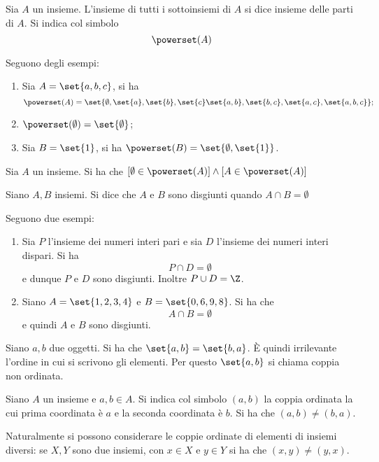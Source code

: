 \begin{definition}\label{def:insieme_parti}
    Sia \(A\) un insieme. L'insieme di tutti i sottoinsiemi di \(A\) si dice insieme delle parti di \(A\). Si indica col simbolo
    \[
        \powerset(A)
    \] 
\end{definition}

\begin{examples}
    Seguono degli esempi:
    \begin{enumerate}
        \item Sia \(A = \set{a, b, c}\), si ha
        \[
            \powerset(A) = \set{\emptyset, \set{a}, \set{b}, \set{c} \set{a, b}, \set{b, c}, \set{a, c}, \set{a, b, c}};  
        \]
        \item \(\powerset(\emptyset) = \set{\emptyset}\);
        \item Sia \(B = \set{1}\), si ha \(\powerset(B) = \set{\emptyset, \set{1}}\).
    \end{enumerate}
\end{examples}


\begin{remark}
    Sia \(A\) un insieme. Si ha che \([\emptyset \in \powerset(A)] \land [A \in \powerset(A)]\)
\end{remark}


\begin{definition}\label{def:insiemi:disgiunti}
    Siano \(A, B\) insiemi. Si dice che \(A\) e \(B\) sono disgiunti quando \(A \cap B = \emptyset\)
\end{definition}


\begin{examples}
    Seguono due esempi:
    \begin{enumerate}
        \item Sia \(P\) l'insieme dei numeri interi pari e sia \(D\) l'insieme dei numeri interi dispari. Si ha
            \[
                P \cap D = \emptyset
            \]
            e dunque \(P\) e \(D\) sono disgiunti. Inoltre \(P \cup D = \Z\).
        \item Siano \(A = \set{1, 2, 3, 4}\) e \(B = \set{0, 6, 9, 8}\). Si ha che
            \[
                A \cap B = \emptyset
            \]
            e quindi \(A\) e \(B\) sono disgiunti.
    \end{enumerate}
\end{examples}

\begin{remark}
    Siano \(a, b\) due oggetti. Si ha che \(\set{a, b} = \set{b, a}\). È quindi irrilevante l'ordine in cui si scrivono gli elementi. Per questo \(\set{a, b}\) si chiama coppia non ordinata.

    Siano \(A\) un insieme e \(a, b \in A\). Si indica col simbolo \((a, b)\) la coppia ordinata la cui prima coordinata è \(a\) e la seconda coordinata è \(b\). Si ha che \((a, b) \neq (b, a)\).
\end{remark}
Naturalmente si possono considerare le coppie ordinate di elementi di insiemi diversi: se \(X, Y\) sono due insiemi, con \(x \in X\) e \(y \in Y\) si ha che \((x, y) \neq (y, x)\). 


